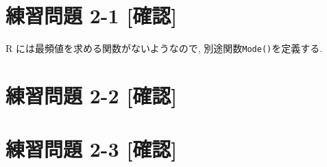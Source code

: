\documentclass[
]{book}
\newenvironment{Shaded}{\begin{snugshade}}{\end{snugshade}}
\newcommand{\ControlFlowTok}[1]{\textcolor[rgb]{0.13,0.29,0.53}{\textbf{#1}}}
\newcommand{\DocumentationTok}[1]{\textcolor[rgb]{0.56,0.35,0.01}{\textbf{\textit{#1}}}}
\newcommand{\FunctionTok}[1]{\textcolor[rgb]{0.13,0.29,0.53}{\textbf{#1}}}
\newcommand{\NormalTok}[1]{#1}
\newcommand{\OtherTok}[1]{\textcolor[rgb]{0.56,0.35,0.01}{#1}}
\newcommand{\SpecialCharTok}[1]{\textcolor[rgb]{0.81,0.36,0.00}{\textbf{#1}}}
\newcommand{\StringTok}[1]{\textcolor[rgb]{0.31,0.60,0.02}{#1}}
\begin{document}
\hypertarget{ux7df4ux7fd2ux554fux984c-2-1-ux78baux8a8d}{%
\section*{練習問題 2-1 {[}確認{]}}\label{ux7df4ux7fd2ux554fux984c-2-1-ux78baux8a8d}}

R には最頻値を求める関数がないようなので, 別途関数\texttt{Mode()}を定義する.

\begin{Shaded}
\end{Shaded}

\hypertarget{ux7df4ux7fd2ux554fux984c-2-2-ux78baux8a8d}{%
\section*{練習問題 2-2 {[}確認{]}}\label{ux7df4ux7fd2ux554fux984c-2-2-ux78baux8a8d}}

\hypertarget{ux7df4ux7fd2ux554fux984c-2-3-ux78baux8a8d}{%
\section*{練習問題 2-3 {[}確認{]}}\label{ux7df4ux7fd2ux554fux984c-2-3-ux78baux8a8d}}
\end{document}
